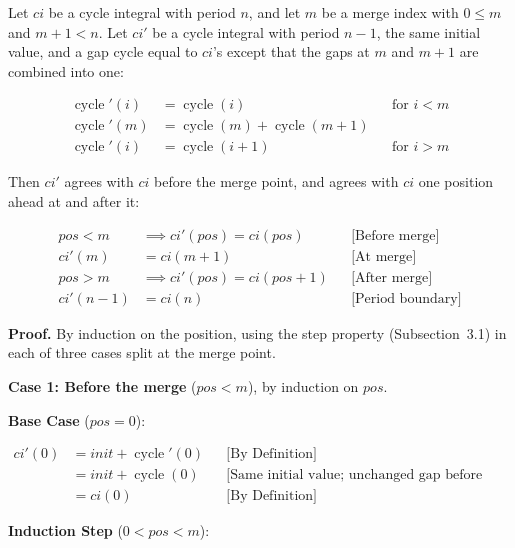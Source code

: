 Let $ci$ be a cycle integral with period $n$, and let $m$ be a merge index
with $0 \le m$ and $m + 1 < n$. Let $ci'$ be a cycle integral with period
$n - 1$, the same initial value, and a gap cycle equal to $ci$'s except
that the gaps at $m$ and $m + 1$ are combined into one:

\begin{equation*}
\begin{aligned}
\operatorname{cycle}'(i) &= \operatorname{cycle}(i)
  &&\text{for } i < m \\
\operatorname{cycle}'(m) &= \operatorname{cycle}(m) + \operatorname{cycle}(m + 1) \\
\operatorname{cycle}'(i) &= \operatorname{cycle}(i + 1)
  &&\text{for } i > m
\end{aligned}
\end{equation*}

Then $ci'$ agrees with $ci$ before the merge point, and agrees with $ci$
one position ahead at and after it:

\begin{equation*}
\begin{aligned}
pos < m &\implies ci'(pos) = ci(pos)
  &&\text{[Before merge]} \\
ci'(m) &= ci(m + 1)
  &&\text{[At merge]} \\
pos > m &\implies ci'(pos) = ci(pos + 1)
  &&\text{[After merge]} \\
ci'(n - 1) &= ci(n)
  &&\text{[Period boundary]}
\end{aligned}
\end{equation*}

\textbf{Proof.} By induction on the position, using the step property
(Subsection~3.1) in each of three cases split at the merge point.

\textbf{Case 1: Before the merge} ($pos < m$), by induction on $pos$.

\textbf{Base Case} ($pos = 0$):

\begin{equation*}
\begin{aligned}
ci'(0) &= init + \operatorname{cycle}'(0)
  &&\text{[By Definition]} \\
&= init + \operatorname{cycle}(0)
  &&\text{[Same initial value; unchanged gap before merge]} \\
&= ci(0)
  &&\text{[By Definition]}
\end{aligned}
\end{equation*}

\textbf{Induction Step} ($0 < pos < m$):

